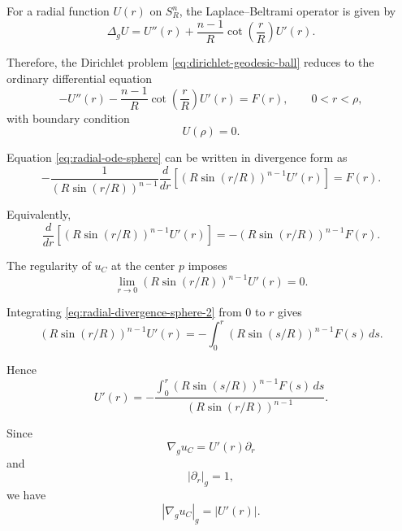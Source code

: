 \documentclass{article}
\renewcommand{\boxed}[1]{#1}
\begin{document}
For a radial function $U(r)$ on $S_R^n$, the Laplace--Beltrami operator
is given by
\begin{equation}
\Delta_g U
=
U''(r)
+
\frac{n-1}{R}
\cot\left(\frac{r}{R}\right)U'(r).
\label{eq:radial-laplacian-sphere}
\end{equation}

Therefore, the Dirichlet problem
\eqref{eq:dirichlet-geodesic-ball} reduces to the ordinary differential
equation
\begin{equation}
-
U''(r)
-
\frac{n-1}{R}
\cot\left(\frac{r}{R}\right)U'(r)
=
F(r),
\qquad
0<r<\rho,
\label{eq:radial-ode-sphere}
\end{equation}
with boundary condition
\begin{equation}
U(\rho)=0.
\label{eq:radial-boundary-sphere}
\end{equation}

Equation \eqref{eq:radial-ode-sphere} can be written in divergence
form as
\begin{equation}
-
\frac{1}
{\left(R\sin(r/R)\right)^{n-1}}
\frac{d}{dr}
\left[
\left(R\sin(r/R)\right)^{n-1}U'(r)
\right]
=
F(r).
\label{eq:radial-divergence-sphere}
\end{equation}

Equivalently,
\begin{equation}
\frac{d}{dr}
\left[
\left(R\sin(r/R)\right)^{n-1}U'(r)
\right]
=
-
\left(R\sin(r/R)\right)^{n-1}F(r).
\label{eq:radial-divergence-sphere-2}
\end{equation}

The regularity of $u_C$ at the center $p$ imposes
\begin{equation}
\lim_{r\to0}
\left(R\sin(r/R)\right)^{n-1}U'(r)
=
0.
\label{eq:regularity-center}
\end{equation}

Integrating \eqref{eq:radial-divergence-sphere-2} from $0$ to $r$ gives
\begin{equation}
\left(R\sin(r/R)\right)^{n-1}U'(r)
=
-
\int_0^r
\left(R\sin(s/R)\right)^{n-1}
F(s)\,ds.
\label{eq:radial-derivative-integral}
\end{equation}

Hence
\begin{equation}
\boxed{
U'(r)
=
-
\frac{
\displaystyle
\int_0^r
\left(R\sin(s/R)\right)^{n-1}
F(s)\,ds
}{
\left(R\sin(r/R)\right)^{n-1}
}.
}
\label{eq:radial-U-prime}
\end{equation}

Since
\[
\nabla_g u_C
=
U'(r)\partial_r
\]
and
\[
|\partial_r|_g=1,
\]
we have
\begin{equation}
|\nabla_g u_C|_g
=
|U'(r)|.
\label{eq:gradient-radial-sphere}
\end{equation}
\end{document}
